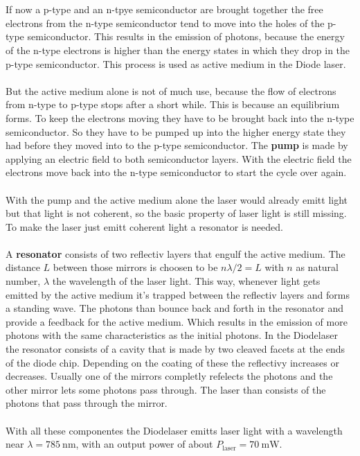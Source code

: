 \\\\
\FloatBarrier
If now a p-type and an n-tpye semiconductor are brought together the free electrons from the n-type semiconductor tend to move into the holes of the p-type semiconductor.
This results in the emission of photons, because the energy of the n-type electrons is higher than the energy states in which they drop in the p-type semiconductor.
This process is used as active medium in the Diode laser.
\\\\
But the active medium alone is not of much use, because the flow of electrons from n-type to p-type stops after a short while.
This is because an equilibrium forms.
To keep the electrons moving they have to be brought back into the n-type semiconductor.
So they have to be pumped up into the higher energy state they had before they moved into to the p-type semiconductor.
The \textbf{pump} is made by applying an electric field to both semiconductor layers.
With the electric field the electrons move back into the n-type semiconductor to start the cycle over again.
\\\\
With the pump and the active medium alone the laser would already emitt light but that light is not coherent, so the basic property of laser light is still missing.
To make the laser just emitt coherent light a resonator is needed.
\\\\
A \textbf{resonator} consists of two reflectiv layers that engulf the active medium.
The distance $L$ between those mirrors is choosen to be $n \lambda/2 = L$ with $n$ as natural number, $\lambda$ the wavelength of the laser light.
This way, whenever light gets emitted by the active medium it's trapped between the reflectiv layers and forms a standing wave.
The photons than bounce back and forth in the resonator and provide a feedback for the active medium.
Which results in the emission of more photons with the same characteristics as the initial photons.
In the Diodelaser the resonator consists of a cavity that is made by two cleaved facets at the ends of the diode chip.
Depending on the coating of these the reflectivy increases or decreases.
Usually one of the mirrors completly refelects the photons and the other mirror lets some photons pass through.
The laser than consists of the photons that pass through the mirror.
\\\\
With all these componentes the Diodelaser emitts laser light with a wavelength near $\lambda = \SI{785}{\nano\meter}$, with an output power of about $P_\text{laser} = \SI{70}{\milli\W}$.


